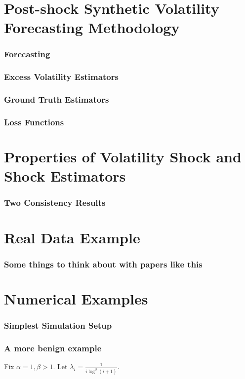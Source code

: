 \documentclass{beamer}
\theoremstyle{definition}
\begin{document}
\section{Post-shock Synthetic Volatility Forecasting Methodology}

\begin{frame}
\frametitle{Forecasting}
\end{frame}

\begin{frame}
\frametitle{Excess Volatility Estimators}
\end{frame}

\begin{frame}

\frametitle{Ground Truth Estimators}

\end{frame}

\begin{frame}

\frametitle{Loss Functions}
\end{frame}

\section{Properties of Volatility Shock and Shock Estimators}
\frametitle{Two Consistency Results}



\section{Real Data Example}

\begin{frame}
\frametitle{Some things to think about with papers like this}

\end{frame}


\section{Numerical Examples}

\begin{frame}
\fontsize{8pt}{9pt}
\frametitle{Simplest Simulation Setup}

\end{frame}

\begin{frame}
\frametitle{A more benign example}

\begin{example}
Fix $\alpha = 1, \beta > 1$.  Let $\lambda_{i} = \frac{1}{i \log^{\beta}(i+1)}$.

\end{example}

\end{frame}
\end{document}
